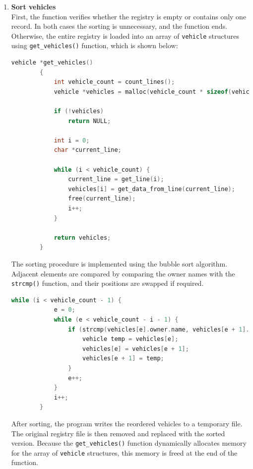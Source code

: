 \documentclass[12pt, a4paper]{article}
\begin{document}
\begin{enumerate}
  \item \textbf{Sort vehicles} \\

    First, the function verifies whether the registry is empty or contains only one record. In both cases the sorting is unnecessary, and the function ends. Otherwise, the entire registry is loaded into an array of \texttt{vehicle} structures using \texttt{get\_vehicles()} function, which is shown below: \\
    
        \begin{lstlisting}[language=C, caption={CSV line to data structure transformation}]
            vehicle *get_vehicles()
        {
            int vehicle_count = count_lines();
            vehicle *vehicles = malloc(vehicle_count * sizeof(vehicle));
        
            if (!vehicles)
                return NULL;
        
            int i = 0;
            char *current_line;
        
            while (i < vehicle_count) {
                current_line = get_line(i);
                vehicles[i] = get_data_from_line(current_line);
                free(current_line);
                i++;
            }
        
            return vehicles;
        }
        \end{lstlisting}

    The sorting procedure is implemented using the bubble sort algorithm. Adjacent elements are compared by comparing the owner names with the \texttt{strcmp()} function, and their positions are swapped if required.

        \begin{lstlisting}[language=C, caption={Bubble sort algorithm}]
        while (i < vehicle_count - 1) {
            e = 0;
            while (e < vehicle_count - i - 1) {
                if (strcmp(vehicles[e].owner.name, vehicles[e + 1].owner.name) > 0) {
                    vehicle temp = vehicles[e];
                    vehicles[e] = vehicles[e + 1];
                    vehicles[e + 1] = temp;
                }
                e++;
            }
            i++;
        }
    \end{lstlisting}

After sorting, the program writes the reordered vehicles to a temporary file. 
The original registry file is then removed and replaced with the sorted version. 
Because the \texttt{get\_vehicles()} function dynamically allocates memory for the array of \texttt{vehicle} structures, this memory is freed at the end of the function.


\end{enumerate}
\end{document}
